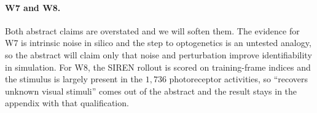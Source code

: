 \paragraph{W7 and W8.}
Both abstract claims are overstated and we will soften them. The evidence for W7
is intrinsic noise in silico and the step to optogenetics is an untested analogy,
so the abstract will claim only that noise and perturbation improve
identifiability in simulation. For W8, the SIREN rollout is scored on
training-frame indices and the stimulus is largely present in the $1{,}736$
photoreceptor activities, so ``recovers unknown visual stimuli'' comes out of the
abstract and the result stays in the appendix with that qualification.
